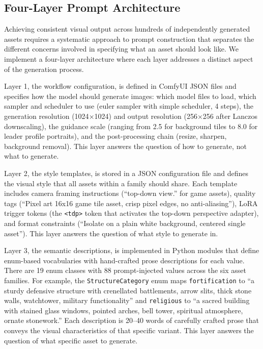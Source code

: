 \documentclass[conference]{IEEEtran}
\begin{document}
\subsection{Four-Layer Prompt Architecture}

Achieving consistent visual output across hundreds of independently generated assets requires a systematic approach to prompt construction that separates the different concerns involved in specifying what an asset should look like. We implement a four-layer architecture where each layer addresses a distinct aspect of the generation process.

Layer 1, the workflow configuration, is defined in ComfyUI JSON files and specifies how the model should generate images: which model files to load, which sampler and scheduler to use (euler sampler with simple scheduler, 4 steps), the generation resolution (1024$\times$1024) and output resolution (256$\times$256 after Lanczos downscaling), the guidance scale (ranging from 2.5 for background tiles to 8.0 for leader profile portraits), and the post-processing chain (resize, sharpen, background removal). This layer answers the question of how to generate, not what to generate.

Layer 2, the style templates, is stored in a JSON configuration file and defines the visual style that all assets within a family should share. Each template includes camera framing instructions (``top-down view.'' for game assets), quality tags (``Pixel art 16x16 game tile asset, crisp pixel edges, no anti-aliasing''), LoRA trigger tokens (the \texttt{<tdp>} token that activates the top-down perspective adapter), and format constraints (``Isolate on a plain white background, centered single asset''). This layer answers the question of what style to generate in.

Layer 3, the semantic descriptions, is implemented in Python modules that define enum-based vocabularies with hand-crafted prose descriptions for each value. There are 19 enum classes with 88 prompt-injected values across the six asset families. For example, the \texttt{StructureCategory} enum maps \texttt{fortification} to ``a sturdy defensive structure with crenellated battlements, arrow slits, thick stone walls, watchtower, military functionality'' and \texttt{religious} to ``a sacred building with stained glass windows, pointed arches, bell tower, spiritual atmosphere, ornate stonework.'' Each description is 20--40 words of carefully crafted prose that conveys the visual characteristics of that specific variant. This layer answers the question of what specific asset to generate.
\end{document}
